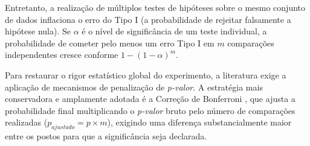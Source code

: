 Entretanto, a realização de múltiplos testes de hipóteses sobre o mesmo conjunto de dados inflaciona o erro do Tipo I (a probabilidade de rejeitar falsamente a hipótese nula). Se $\alpha$ é o nível de significância de um teste individual, a probabilidade de cometer pelo menos um erro Tipo I em $m$ comparações independentes cresce conforme $1 - (1-\alpha)^m$.

Para restaurar o rigor estatístico global do experimento, a literatura exige a aplicação de mecanismos de penalização de \textit{p-valor}. A estratégia mais conservadora e amplamente adotada é a Correção de Bonferroni \citep{Dunn01031961}, que ajusta a probabilidade final multiplicando o \textit{p-valor} bruto pelo número de comparações realizadas ($p_{ajustado} = p \times m$), exigindo uma diferença substancialmente maior entre os postos para que a significância seja declarada.
